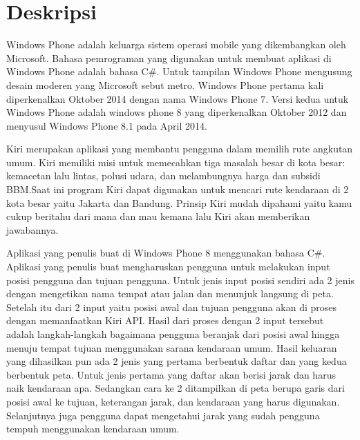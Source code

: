 \documentclass[a4paper,twoside]{article}
\begin{document}
\title{\@judultopik}
\author{\nama \textendash \@npm} 

\newcommand{\nama}{Yohan}
\newcommand{\@npm}{2011730048}
\newcommand{\@judultopik}{Pencari Rute Kendaraan Umum untuk Windows Phone} %
\newcommand{\jumpemb}{1} %
\newcommand{\tanggal}{08/06/2014}
\maketitle


\section{Deskripsi}
Windows Phone adalah keluarga sistem operasi mobile yang dikembangkan oleh Microsoft. Bahasa pemrograman yang digunakan untuk membuat aplikasi di Windows Phone adalah bahasa C\#. Untuk tampilan Windows Phone mengusung desain moderen yang Microsoft sebut metro. Windows Phone pertama kali diperkenalkan Oktober 2014 dengan nama Windows Phone 7. Versi kedua untuk Windows Phone adalah windows phone 8 yang diperkenalkan Oktober 2012 dan menyusul Windows Phone 8.1 pada April 2014.\footnotemark[1]

Kiri merupakan aplikasi yang membantu pengguna dalam memilih rute angkutan umum. Kiri memiliki misi untuk memecahkan tiga masalah besar di kota besar: kemacetan lalu lintas, polusi udara, dan melambungnya harga dan subsidi BBM.\footnotemark[2] Saat ini program Kiri dapat digunakan untuk mencari rute kendaraan di 2 kota besar yaitu Jakarta dan Bandung. Prinsip Kiri mudah dipahami yaitu kamu cukup beritahu dari mana dan mau kemana lalu Kiri akan memberikan jawabannya.

Aplikasi yang penulis buat di Windows Phone 8 menggunakan bahasa C\#. Aplikasi yang penulis buat mengharuskan pengguna untuk melakukan input posisi pengguna dan tujuan pengguna. Untuk jenis input posisi sendiri ada 2 jenis dengan mengetikan nama tempat atau jalan dan menunjuk langsung di peta. Setelah itu dari 2 input yaitu posisi awal dan tujuan pengguna akan di proses dengan memanfaatkan Kiri API. Hasil dari proses dengan 2 input tersebut adalah langkah-langkah bagaimana pengguna beranjak dari posisi awal hingga menuju tempat tujuan menggunakan sarana kendaraan umum. Hasil keluaran yang dihasilkan pun ada 2 jenis yang pertama berbentuk daftar dan yang kedua berbentuk peta. Untuk jenis pertama yang daftar akan berisi jarak dan harus naik kendaraan apa. Sedangkan cara ke 2 ditampilkan di peta berupa garis dari posisi awal ke tujuan, keterangan jarak, dan kendaraan yang harus digunakan. Selanjutnya juga pengguna dapat mengetahui jarak yang sudah pengguna tempuh menggunakan kendaraan umum.
\end{document}
